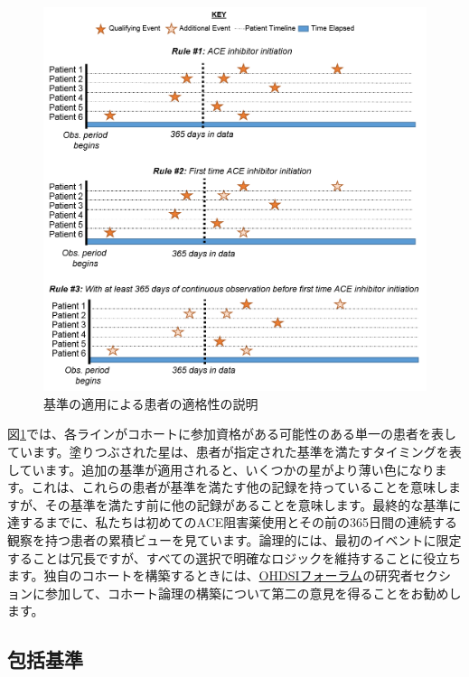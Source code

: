 \documentclass[
  11pt]{book}
\theoremstyle{definition}
\theoremstyle{definition}
\theoremstyle{definition}
\theoremstyle{definition}
\theoremstyle{remark}
\begin{document}
\begin{figure}

{\centering \includegraphics[width=1\linewidth]{images/Cohorts/EarliestEventExplained} 

}

\caption{基準の適用による患者の適格性の説明}\label{fig:EarliestEventExplained}
\end{figure}

図\ref{fig:EarliestEventExplained}では、各ラインがコホートに参加資格がある可能性のある単一の患者を表しています。塗りつぶされた星は、患者が指定された基準を満たすタイミングを表しています。追加の基準が適用されると、いくつかの星がより薄い色になります。これは、これらの患者が基準を満たす他の記録を持っていることを意味しますが、その基準を満たす前に他の記録があることを意味します。最終的な基準に達するまでに、私たちは初めてのACE阻害薬使用とその前の365日間の連続する観察を持つ患者の累積ビューを見ています。論理的には、最初のイベントに限定することは冗長ですが、すべての選択で明確なロジックを維持することに役立ちます。独自のコホートを構築するときには、\href{http://forums.ohdsi.org}{OHDSIフォーラム}の研究者セクションに参加して、コホート論理の構築について第二の意見を得ることをお勧めします。

\subsection{包括基準}\label{ux5305ux62ecux57faux6e96}
\end{document}
